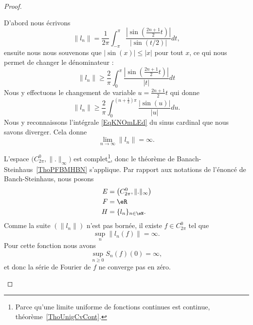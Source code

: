 \begin{proof}
\begin{subproof}
		D'abord nous écrivons
		\begin{equation}
			\| l_n \|=\frac{1}{ 2\pi }\int_{-\pi}^{\pi}\frac{ \left| \sin\left( \frac{ 2n+1 }{2}t \right) \right|  }{ \big| \sin(t/2) \big| }dt,
		\end{equation}
		ensuite nous nous souvenons que \( | \sin(x) |\leq | x |\) pour tout \( x\), ce qui nous permet de changer le dénominateur :
		\begin{equation}
			\| l_n \|\geq \frac{ 2 }{ \pi }\int_0^{\pi}\frac{ \left| \sin\left( \frac{ 2n+1 }{2}t \right) \right|  }{ | t | }dt
		\end{equation}
		Nous y effectuons le changement de variable \( u=\frac{ 2n+1 }{2}t\) qui donne
		\begin{equation}
			\| l_n \|\geq \frac{ 2 }{ \pi }\int_{0}^{(n+\frac{ 1 }{2})\pi}\frac{ \big| \sin(u) \big| }{ | u | }du.
		\end{equation}
		Nous y reconnaissons l'intégrale \eqref{EqKNOmLEd} du sinus cardinal que nous savons diverger. Cela donne
		\begin{equation}
			\lim_{n\to \infty} \| l_n \|=\infty.
		\end{equation}
		\spitem[La conclusion]

		L'espace \( \big( C^0_{2\pi},\| . \|_{\infty} \big)\) est complet\footnote{Parce qu'une limite uniforme de fonctions continues est continue, théorème~\ref{ThoUnigCvCont}.}, donc le théorème de Banach-Steinhaus~\ref{ThoPFBMHBN} s'applique. Par rapport aux notations de l'énoncé de Banch-Steinhaus, nous posons
		\begin{subequations}
			\begin{align}
				E & =\big( C^0_{2\pi},\| . \|_{\infty} \big) \\
				F & =\eR                                     \\
				H & =\{ l_n \}_{n\in \eN}.
			\end{align}
		\end{subequations}
		Comme la suite \( (\| l_n \|)\) n'est pas bornée, il existe \( f\in C^0_{2\pi}\) tel que
		\begin{equation}
			\sup_n\| l_n(f) \|=\infty.
		\end{equation}
		Pour cette fonction nous avons
		\begin{equation}
			\sup_{n\geq 0}S_n(f)(0)=\infty,
		\end{equation}
		et donc la série de Fourier de \( f\) ne converge pas en zéro.

	\end{subproof}
\end{proof}

